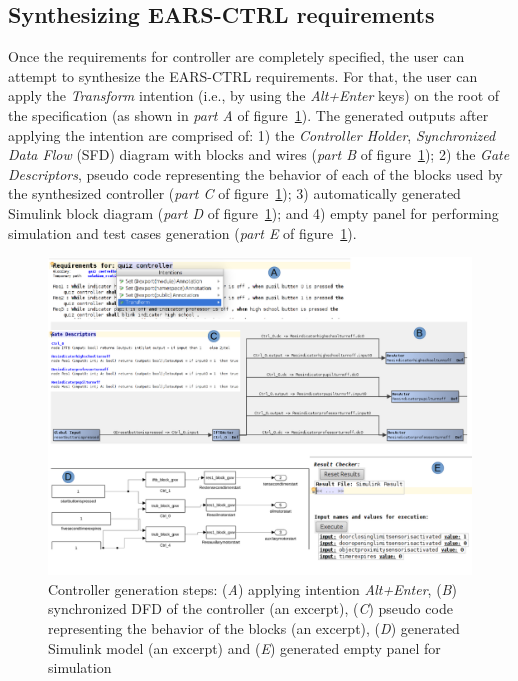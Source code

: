 \subsection{Synthesizing \textsf{EARS-CTRL} requirements}
\label{SynthReq}
\vspace{-.3cm}
Once the requirements for controller are completely specified, the user can
attempt to synthesize the \textsf{EARS-CTRL} requirements. For that,
the user can apply the \emph{Transform} intention (i.e., by using the \emph{Alt+Enter} keys) on the root of the specification (as
shown in \emph{part A} of figure~\ref{fig:Spec_transform}). The generated outputs after applying the
intention are comprised of: 1) the \emph{Controller Holder},
\emph{Synchronized Data Flow} (SFD) diagram with blocks and wires
(\emph{part B} of figure~\ref{fig:Spec_transform}); 2) the \emph{Gate Descriptors}, pseudo
code representing the behavior of each of the blocks used by the synthesized controller (\emph{part C} of
figure~\ref{fig:Spec_transform}); 3) automatically generated Simulink block
diagram (\emph{part D} of
figure~\ref{fig:Spec_transform}); and 4) empty panel for performing simulation
and test cases generation (\emph{part E} of
figure~\ref{fig:Spec_transform}).
\begin{figure}[!h]
\centering
\includegraphics[width=1\textwidth]{./images/Transform.png}
\caption{Controller generation steps: (\emph{A}) applying intention \emph{Alt+Enter},
(\emph{B}) synchronized DFD of the controller (an excerpt), (\emph{C}) pseudo
code representing the behavior of the blocks (an excerpt), (\emph{D})
generated Simulink model (an excerpt) and (\emph{E})
generated empty panel for simulation}
\label{fig:Spec_transform}
\end{figure}
\vspace{-.5cm}
